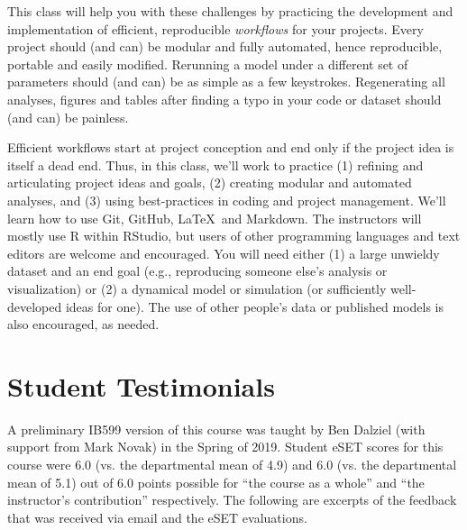 \documentclass[10pt]{article}
\begin{document}
This class will help you with these challenges by practicing the development and implementation of efficient, reproducible \emph{workflows} for your projects.  Every project should (and can) be modular and fully automated, hence reproducible, portable and easily modified.  Rerunning a model under a different set of parameters should (and can) be as simple as a few keystrokes. Regenerating all analyses, figures and tables after finding a typo in your code or dataset should (and can) be painless.

Efficient workflows start at project conception and end only if the project idea is itself a dead end.  Thus, in this class, we'll work to practice (1) refining and articulating project ideas and goals, (2) creating modular and automated analyses, and (3) using best-practices in coding and project management. We'll learn how to use Git, GitHub, \LaTeX\, and Markdown.  The instructors will mostly use \textsf{R} within RStudio, but users of other programming languages and text editors are welcome and encouraged.  You will need either (1) a large unwieldy dataset and an end goal (e.g., reproducing someone else's analysis or visualization) or (2) a dynamical model or simulation (or sufficiently well-developed ideas for one).  The use of other people's data or published models is also encouraged, as needed.

\section*{Student Testimonials}
A preliminary IB599 version of this course was taught by Ben Dalziel (with support from Mark Novak) in the Spring of 2019.  Student eSET scores for this course were 6.0 (vs. the departmental mean of 4.9) and 6.0 (vs. the departmental mean of 5.1) out of 6.0 points possible for ``the course as a whole'' and ``the instructor's contribution'' respectively. The following are excerpts of the feedback that was received via email and the eSET evaluations.
\end{document}
